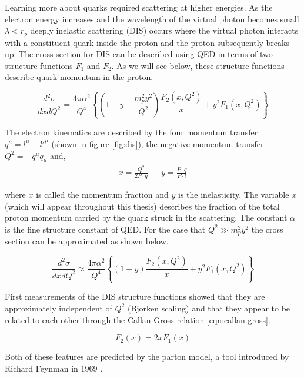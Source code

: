 Learning more about quarks required scattering at higher energies.  As the electron energy increases and the wavelength of the virtual photon becomes small $\lambda < r_p$ deeply inelastic scattering (DIS) occurs where the virtual photon interacts with a constituent quark inside the proton and the proton subsequently breaks up.  The cross section for DIS can be described using QED in terms of two structure functions $F_1$ and $F_2$.  As we will see below, these structure functions describe quark momentum in the proton.

\begin{equation}
	\label{eqn:sfs}
	\frac{d^2\sigma}{dx dQ^2} = \frac{4 \pi \alpha^2}{Q^4} \left\lbrace \left( 1 - y - \frac{m_p^2 y^2}{Q^2} \right) \frac{F_2(x,Q^2)}{x} + y^2 F_1 (x,Q^2) \right\rbrace
\end{equation}

The electron kinematics are described by the four momentum transfer $q^{\mu} = l^{\mu} - l'^{\mu}$ (shown in figure \ref{fig:dis}), the negative momentum transfer $Q^2 = - q^{\mu} q_{\mu}$ and,
\begin{align}  
  x = \frac{Q^{2}}{2P \cdot q} && y = \frac{P \cdot q}{P \cdot l} 
\end{align}

where $x$ is called the momentum fraction and $y$ is the inelasticity.  The variable $x$ (which will appear throughout this thesis) describes the fraction of the total proton momentum carried by the quark struck in the scattering.  The constant $\alpha$ is the fine structure constant of QED.  For the case that $Q^2 \gg m_p^2 y^2$ the cross section can be approximated as shown below.

\begin{equation}
	\label{eqn:sfs2}
	\frac{d^2\sigma}{dx dQ^2} \approx \frac{4 \pi \alpha^2}{Q^4} \left\lbrace \left( 1 - y \right) \frac{F_2(x,Q^2)}{x} + y^2 F_1 (x,Q^2) \right\rbrace
\end{equation}

First measurements of the DIS structure functions \cite{history-bjorken:1969} showed that they are approximately independent of $Q^2$ (Bjorken scaling) and that they appear to be related to each other through the Callan-Gross relation \ref{eqn:callan-gross}.

\begin{equation}	
	F_{2} (x) = 2xF_1 (x)
	\label{eqn:callan-gross}
\end{equation}

Both of these features are predicted by the parton model, a tool introduced by Richard Feynman in 1969 \cite{history-feynman:1969}.


